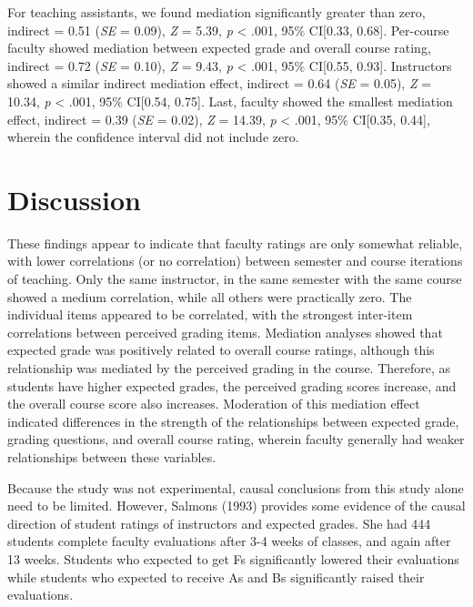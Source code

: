 \documentclass[,man,mask]{apa6}
\begin{document}
For teaching assistants, we found mediation significantly greater than zero, indirect = 0.51 (\emph{SE} = 0.09), \emph{Z} = 5.39, \emph{p} \textless{} .001, 95\% CI{[}0.33, 0.68{]}. Per-course faculty showed mediation between expected grade and overall course rating, indirect = 0.72 (\emph{SE} = 0.10), \emph{Z} = 9.43, \emph{p} \textless{} .001, 95\% CI{[}0.55, 0.93{]}. Instructors showed a similar indirect mediation effect, indirect = 0.64 (\emph{SE} = 0.05), \emph{Z} = 10.34, \emph{p} \textless{} .001, 95\% CI{[}0.54, 0.75{]}. Last, faculty showed the smallest mediation effect, indirect = 0.39 (\emph{SE} = 0.02), \emph{Z} = 14.39, \emph{p} \textless{} .001, 95\% CI{[}0.35, 0.44{]}, wherein the confidence interval did not include zero.

\hypertarget{discussion}{%
\section{Discussion}\label{discussion}}

These findings appear to indicate that faculty ratings are only somewhat reliable, with lower correlations (or no correlation) between semester and course iterations of teaching. Only the same instructor, in the same semester with the same course showed a medium correlation, while all others were practically zero. The individual items appeared to be correlated, with the strongest inter-item correlations between perceived grading items. Mediation analyses showed that expected grade was positively related to overall course ratings, although this relationship was mediated by the perceived grading in the course. Therefore, as students have higher expected grades, the perceived grading scores increase, and the overall course score also increases. Moderation of this mediation effect indicated differences in the strength of the relationships between expected grade, grading questions, and overall course rating, wherein faculty generally had weaker relationships between these variables.

Because the study was not experimental, causal conclusions from this study alone need to be limited. However, Salmons (1993) provides some evidence of the causal direction of student ratings of instructors and expected grades. She had 444 students complete faculty evaluations after 3-4 weeks of classes, and again after 13 weeks. Students who expected to get Fs significantly lowered their evaluations while students who expected to receive As and Bs significantly raised their evaluations.
\end{document}
